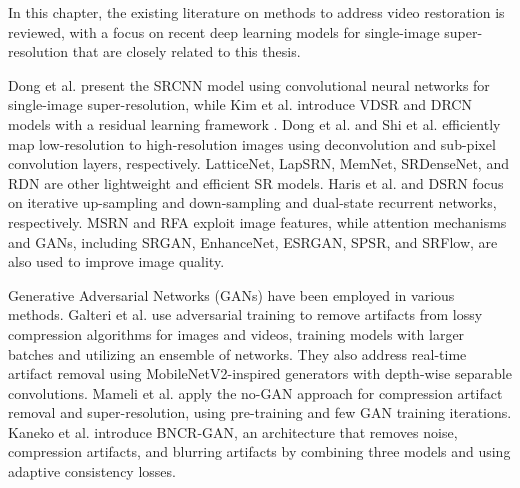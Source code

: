 \label{chap:Background}

In this chapter, the existing literature on methods to address video restoration is reviewed, with a focus on recent deep learning models for single-image super-resolution that are closely related to this thesis.


Dong et al. \cite{dong2014learning} present the SRCNN model using convolutional neural networks for single-image super-resolution, while Kim et al. introduce VDSR \cite{kim2016accurate} and DRCN \cite{kim2016deeply} models with a residual learning framework \cite{he2016deep}. Dong et al. and Shi et al. efficiently map low-resolution to high-resolution images using deconvolution and sub-pixel convolution layers, respectively. LatticeNet, LapSRN, MemNet, SRDenseNet, and RDN are other lightweight and efficient SR models. Haris et al. and DSRN focus on iterative up-sampling and down-sampling and dual-state recurrent networks, respectively. MSRN and RFA exploit image features, while attention mechanisms and GANs, including SRGAN, EnhanceNet, ESRGAN, SPSR, and SRFlow, are also used to improve image quality.

Generative Adversarial Networks (GANs) have been employed in various methods. Galteri et al. use adversarial training to remove artifacts from lossy compression algorithms for images and videos, training models with larger batches and utilizing an ensemble of networks. They also address real-time artifact removal using MobileNetV2-inspired generators with depth-wise separable convolutions. Mameli et al. apply the no-GAN approach for compression artifact removal and super-resolution, using pre-training and few GAN training iterations. Kaneko et al. introduce BNCR-GAN, an architecture that removes noise, compression artifacts, and blurring artifacts by combining three models and using adaptive consistency losses.

